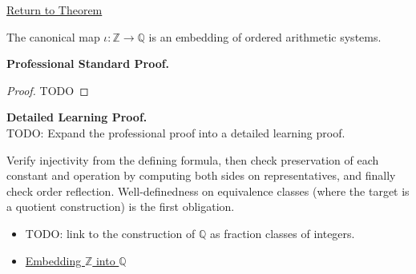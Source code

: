 \newpage
{}
\label{prf:z-embeds-in-q}

\begin{remark*}[Return]
\hyperref[thm:z-embeds-in-q]{Return to Theorem}
\end{remark*}

\begin{theorem*}
The canonical map $\iota:\mathbb{Z}\to \mathbb{Q}$ is an embedding of ordered arithmetic systems.
\end{theorem*}

\textbf{Professional Standard Proof.}~\\
\begin{proof}
TODO
\end{proof}

\textbf{Detailed Learning Proof.}~\\
TODO: Expand the professional proof into a detailed learning proof.

\begin{remark*}
Verify injectivity from the defining formula, then check preservation of each constant and operation by computing both sides on representatives, and finally check order reflection. Well-definedness on equivalence classes (where the target is a quotient construction) is the first obligation.
\end{remark*}

\begin{dependencies}
\begin{itemize}
  \item TODO: link to the construction of $\mathbb{Q}$ as fraction classes of integers.
  \item \hyperref[def:embedding-z-into-q]{Embedding $\mathbb{Z}$ into $\mathbb{Q}$}
\end{itemize}
\end{dependencies}
